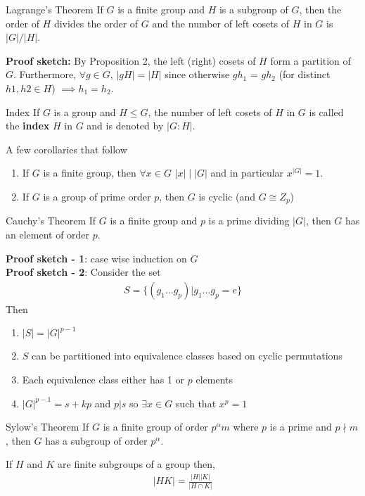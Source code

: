 \documentclass[titlepage, 12pt]{article}
\begin{document}
\begin{theorem}{Lagrange's Theorem}{}
    If $G$ is a finite group and $H$ is a subgroup of $G$, then the order of $H$
    divides the order of $G$ and the number of left cosets of $H$ in $G$ is
    $|G|/|H|$.
\end{theorem}
\textbf{Proof sketch:} By Proposition 2, the left (right) cosets of $H$ form a
partition of $G$. Furthermore, $\forall g\in G$, $|gH| = |H|$ since otherwise
$gh_1$ = $gh_2$ (for distinct $h1, h2\in H$) $\implies h_1 = h_2$.
\begin{definition}{Index}{}
    If $G$ is a group and $H\le G$, the number of left cosets of $H$ in $G$ is
    called the \textbf{index} $H$ in $G$ and is denoted by $|G:H|$.
\end{definition}
A few corollaries that follow
\begin{enumerate}
    \item If $G$ is a finite group, then $\forall x\in G$ $|x|\mid |G|$ and in
        particular $x^{|G|} = 1$.
    \item If $G$ is a group of prime order $p$, then $G$ is cyclic (and $G\cong
        Z_p$)
\end{enumerate}
\begin{theorem}{Cauchy's Theorem}{}
    If $G$ is a finite group and $p$ is a prime dividing $|G|$, then $G$ has an
    element of order $p$.
\end{theorem}
\textbf{Proof sketch - 1}: case wise induction on $G$\\
\textbf{Proof sketch - 2}: Consider the set
\begin{gather*}
    S = \{(g_1\dots g_p) | g_1\dots g_p = e\}
\end{gather*}
Then
\begin{enumerate}
    \item $|S| = |G|^{p-1}$
    \item $S$ can be partitioned into equivalence classes based on cyclic
        permutations
    \item Each equivalence class either has 1 or $p$ elements
    \item $|G|^{p-1} = s + kp$ and $p|s$ so $\exists x\in G$ such that $x^p = 1$
\end{enumerate}
\begin{theorem}{Sylow's Theorem}{}
    If $G$ is a finite group of order $p^\alpha m$ where $p$ is a prime and
    $p\nmid m$, then $G$ has a subgroup of order $p^\alpha$.
\end{theorem}
\begin{proposition}{}{}
    If $H$ and $K$ are finite subgroups of a group then,
    \begin{gather*}
        |HK| = \frac{|H||K|}{|H\cap K|}
    \end{gather*}
\end{proposition}{}{}
\end{document}
